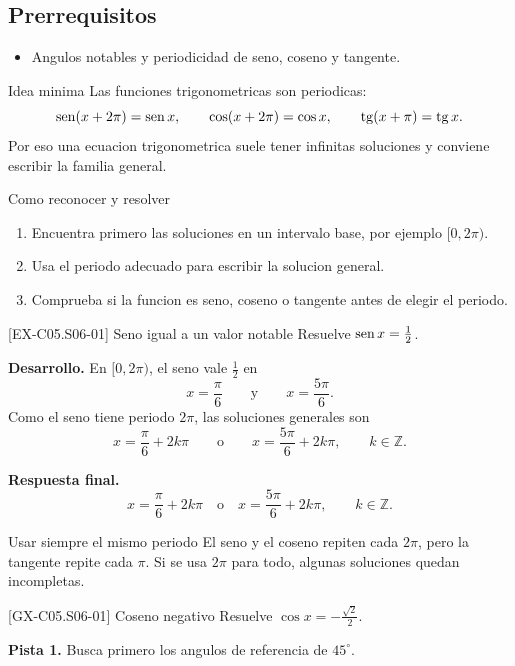 \subsection*{Prerrequisitos}
\begin{itemize}
  \item Angulos notables y periodicidad de seno, coseno y tangente.
\end{itemize}

\begin{theorybox}{Idea minima}
Las funciones trigonometricas son periodicas:
\[
\operatorname{sen}(x+2\pi)=\operatorname{sen} x,
\qquad
\cos(x+2\pi)=\cos x,
\qquad
\operatorname{tg}(x+\pi)=\operatorname{tg} x.
\]
Por eso una ecuacion trigonometrica suele tener infinitas soluciones y conviene escribir la
familia general.
\end{theorybox}

\begin{methodbox}{Como reconocer y resolver}
\begin{enumerate}
  \item Encuentra primero las soluciones en un intervalo base, por ejemplo \([0,2\pi)\).
  \item Usa el periodo adecuado para escribir la solucion general.
  \item Comprueba si la funcion es seno, coseno o tangente antes de elegir el periodo.
\end{enumerate}
\end{methodbox}

\begin{solvedexample}{[EX-C05.S06-01] Seno igual a un valor notable}
Resuelve \(\operatorname{sen} x=\frac{1}{2}\).

\textbf{Desarrollo.} En \([0,2\pi)\), el seno vale \(\frac{1}{2}\) en
\[
x=\frac{\pi}{6}
\qquad \text{y} \qquad
x=\frac{5\pi}{6}.
\]
Como el seno tiene periodo \(2\pi\), las soluciones generales son
\[
x=\frac{\pi}{6}+2k\pi
\qquad \text{o} \qquad
x=\frac{5\pi}{6}+2k\pi,
\qquad k\in\mathbb{Z}.
\]

\textbf{Respuesta final.}
\[
x=\frac{\pi}{6}+2k\pi
\quad \text{o} \quad
x=\frac{5\pi}{6}+2k\pi,
\qquad k\in\mathbb{Z}.
\]
\end{solvedexample}

\begin{commonerror}{Usar siempre el mismo periodo}
El seno y el coseno repiten cada \(2\pi\), pero la tangente repite cada \(\pi\). Si se usa
\(2\pi\) para todo, algunas soluciones quedan incompletas.
\end{commonerror}

\begin{guidedexercise}{[GX-C05.S06-01] Coseno negativo}
Resuelve \(\cos x=-\frac{\sqrt{2}}{2}\).

\textbf{Pista 1.} Busca primero los angulos de referencia de \(45^\circ\).
\end{guidedexercise}

